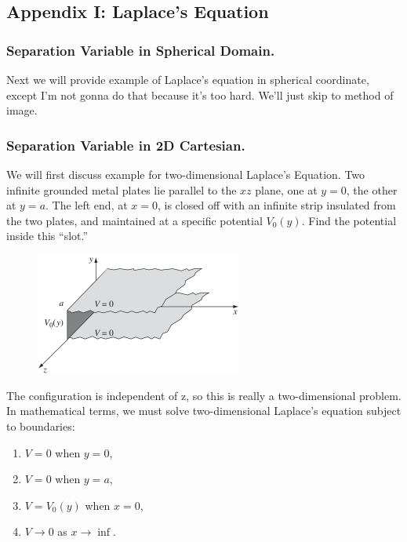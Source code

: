 \documentclass[../../../main.tex]{subfiles}
\begin{document}
\subsection*{Appendix I: Laplace's Equation}

\subsubsection*{Separation Variable in Spherical Domain.} Next we will provide example of Laplace's equation in spherical coordinate, except I'm not gonna do that because it's too hard. We'll just skip to method of image.

\subsubsection*{Separation Variable in 2D Cartesian.} We will first discuss example for two-dimensional Laplace's Equation. Two infinite grounded metal plates lie parallel to the $x z$ plane, one at $y = 0$, the other at $y = a$. The left end, at $x = 0$, is closed off with an infinite strip insulated from the two plates, and maintained at a specific potential $V_0(y)$. Find the potential inside this “slot.”
\begin{figure}[ht]
    \centering
    \includegraphics[height=4cm]{../Rss/Electromagnetism/Potential/CartesianSepVar.png}
\end{figure}
The configuration is independent of z, so this is really a two-dimensional problem.
In mathematical terms, we must solve two-dimensional Laplace's equation subject to boundaries:
\begin{enumerate}
    \item $V = 0$ when $y = 0$,
    \item $V = 0$ when $y = a$,
    \item $V = V_0(y)$ when $x = 0$,
    \item $V \rightarrow 0$ as $x\rightarrow\inf $.
\end{enumerate}
\end{document}
